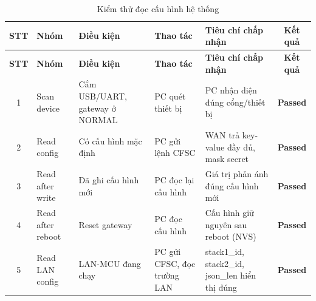         \begin{longtable}{|c|p{}|p{}|p{}|p{}|c|}
            \caption{Kiểm thử đọc cấu hình hệ thống}
            \label{tab:test_read_config} \\
            \hline
            \textbf{STT} & \textbf{Nhóm} & \textbf{Điều kiện} & \textbf{Thao tác} & \textbf{Tiêu chí chấp nhận} & \textbf{Kết quả} \\ \hline
            \endfirsthead

            \hline
            \textbf{STT} & \textbf{Nhóm} & \textbf{Điều kiện} & \textbf{Thao tác} & \textbf{Tiêu chí chấp nhận} & \textbf{Kết quả} \\ \hline
            \endhead

            \hline
            \endfoot
            \endlastfoot

            1 & Scan device & Cắm USB/UART, gateway ở NORMAL & PC quét thiết bị & PC nhận diện đúng cổng/thiết bị & \textcolor{modern_blue}{\textbf{Passed}} \\ \hline
            2 & Read config & Có cấu hình mặc định & PC gửi lệnh CFSC & WAN trả key-value đầy đủ, mask secret & \textcolor{modern_blue}{\textbf{Passed}} \\ \hline
            3 & Read after write & Đã ghi cấu hình mới & PC đọc lại cấu hình & Giá trị phản ánh đúng cấu hình mới & \textcolor{modern_blue}{\textbf{Passed}} \\ \hline
            4 & Read after reboot & Reset gateway & PC đọc cấu hình & Cấu hình giữ nguyên sau reboot (NVS) & \textcolor{modern_blue}{\textbf{Passed}} \\ \hline
            5 & Read LAN config & LAN-MCU đang chạy & PC gửi CFSC, đọc trường LAN & stack1\_id, stack2\_id, json\_len hiển thị đúng & \textcolor{modern_blue}{\textbf{Passed}} \\ \hline
        \end{longtable}

